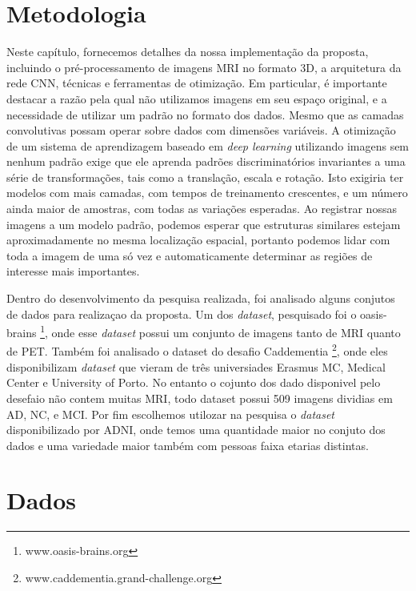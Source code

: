\documentclass[openright]{UFRGS} %
\begin{document}
\section{Metodologia}
Neste capítulo, fornecemos detalhes da nossa implementação da proposta, incluindo o pré-processamento de imagens MRI no formato 3D,
a arquitetura da rede CNN, técnicas e ferramentas de otimização. Em particular, é importante destacar a
razão pela qual não utilizamos imagens em seu espaço original, e a necessidade de utilizar um padrão no formato dos dados.
Mesmo que as camadas convolutivas possam operar sobre dados com dimensões variáveis.
A otimização de um sistema de aprendizagem baseado em  \textit{deep learning} utilizando imagens sem nenhum padrão exige que ele aprenda
padrões discriminatórios invariantes a uma série de transformações, tais como a translação,
escala e rotação. Isto exigiria ter modelos com mais camadas, com tempos de treinamento crescentes,
e um número ainda maior de amostras, com todas as variações esperadas. Ao registrar nossas
imagens a um modelo padrão, podemos esperar que estruturas similares estejam aproximadamente no
mesma localização espacial, portanto podemos lidar com toda a imagem de uma só vez e automaticamente
determinar as regiões de interesse mais importantes.


Dentro do desenvolvimento da pesquisa realizada, foi analisado alguns conjutos de dados para realizaçao da proposta. Um dos \textit{dataset}, pesquisado foi o oasis-brains \footnote{www.oasis-brains.org}, onde esse \textit{dataset} possui um conjunto de imagens tanto de MRI quanto de PET. Também foi analisado o dataset do desafio Caddementia \footnote{www.caddementia.grand-challenge.org}, onde eles disponibilizam \textit{dataset} que vieram  de três universiades 	
Erasmus MC, Medical Center e University of Porto. No entanto o cojunto dos dado disponivel pelo desefaio não  contem muitas MRI, todo dataset possui 509 imagens dividias em AD, NC, e MCI. Por fim  escolhemos utilozar na pesquisa o \textit{dataset} disponibilizado por ADNI, onde temos uma quantidade maior no conjuto dos dados e uma variedade  maior também com pessoas faixa etarias distintas.   



\section{Dados}
\end{document}
